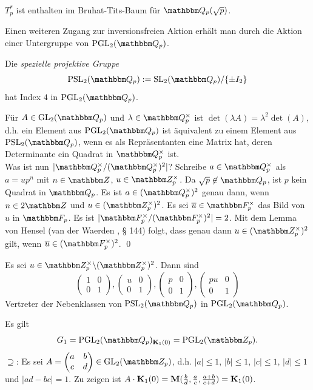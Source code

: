 \documentclass[a4paper, 12pt, twoside]{article}
\begin{document}
$T_p^*$ ist enthalten im Bruhat-Tits-Baum für $\QQ_p(\sqrt{p})$.

Einen weiteren Zugang zur inversionsfreien Aktion erhält man
durch die Aktion einer Untergruppe von $\PGL_2(\QQ_p)$.

\BEM Die \emph{spezielle projektive Gruppe}
\[
\PSL_2(\QQ_p) := \SL_2(\QQ_p)/\{\pm I_2\}
\]
hat Index $4$ in $\PGL_2(\QQ_p)$.

\bew Für $A\in\GL_2(\QQ_p)$ und $\lambda\in\QQ_p^\times$ ist
$\det(\lambda A)=\lambda^2\det(A)$, d.h. ein Element aus
$\PGL_2(\QQ_p)$ ist äquivalent zu einem Element aus
$\PSL_2(\QQ_p)$, wenn es als Repräsentanten eine Matrix hat,
deren Determinante ein Quadrat in $\QQ_p^\times$ ist.\\
Was ist nun $|\QQ_p^\times/(\QQ_p^\times)^2|$?
Schreibe $a\in \QQ_p^\times$ als $a=up^n$ mit $n\in\ZZ$,
$u\in\ZZ_p^\times$. Da $\sqrt{p}\not\in\QQ_p$, ist $p$ kein Quadrat
in $\QQ_p$.
Es ist $a\in(\QQ_p^\times)^2$ genau dann,
wenn $n\in 2\ZZ$ und $u\in(\ZZ_p^\times)^2$. Es sei
$\bar{u}\in\FF_p^\times$ das Bild von $u$ in $\FF_p$.
Es ist $|\FF_p^\times/(\FF_p^\times)^2|=2$. Mit dem Lemma von Hensel
(van der Waerden \cite{vdW}, § 144)
folgt, dass genau dann $u\in(\ZZ_p^\times)^2$ gilt, wenn
$\bar{u}\in(\FF_p^\times)^2$.
\qed

\FOLG Es sei $u\in\ZZ_p^\times\backslash(\ZZ_p^\times)^2$. Dann sind
\[
\begin{pmatrix}
1 & 0 \\
0 & 1
\end{pmatrix},
\begin{pmatrix}
u & 0 \\
0 & 1
\end{pmatrix},
\begin{pmatrix}
p & 0 \\
0 & 1
\end{pmatrix},
\begin{pmatrix}
pu & 0 \\
0 & 1
\end{pmatrix}
\]
Vertreter der Nebenklassen von $\PSL_2(\QQ_p)$ in $\PGL_2(\QQ_p)$.

\PROP\label{prop_stab_K}
Es gilt
\[
G_1 = \PGL_2(\QQ_p)_{\KU_1(0)} = \PGL_2(\ZZ_p).
\]
\bew
\glqq$\supseteq$\grqq:
Es sei $A=\begin{pmatrix}
a & b \\
c & d
\end{pmatrix}
\in\GL_2(\ZZ_p)$, d.h. $|a|\leq 1$, $|b|\leq 1$, $|c|\leq 1$,
$|d|\leq 1$ und $|ad-bc|=1$.
Zu zeigen ist
$A\cdot\mathbf{K}_1(0)=\mathbf{M}(\frac{b}{d},\frac{a}{c},\frac{a+b}{c+d})
=\mathbf{K}_1(0)$.
\end{document}
